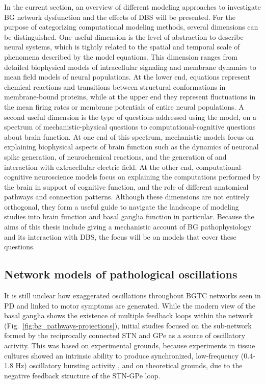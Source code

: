 %
%
%
%
%
%
In the current section, an overview of different modeling approaches to investigate
BG network dysfunction and the effects of DBS will be presented.
For the purpose of categorizing computational modeling methods, several dimensions
can be distinguished. One useful dimension is the level of abstraction to describe
neural systems, which is tightly related to the spatial and temporal scale of phenomena
described by the model equations. This dimension ranges from detailed biophysical models
of intracellular signaling and membrane dynamics to mean field models of neural populations.
At the lower end, equations represent chemical reactions and transitions between structural
conformations in membrane-bound proteins, while at the upper end they represent fluctuations in the
mean firing rates or membrane potentials of entire neural populations.
%
A second useful dimension is the type of questions addressed using the model, on
a spectrum of mechanistic-physical questions to computational-cognitive questions
about brain function.
At one end of this spectrum, mechanistic models focus on explaining biophysical aspects
of brain function such as the dynamics of neuronal spike generation, of neurochemical
reactions, and the generation of and interaction with extracellular electric field.
At the other end, computational-cognitive neuroscience models
focus on explaining the computations performed by the brain in support of cognitive
function, and the role of different anatomical pathways and connection patterns.
%
Although these dimensions are not entirely orthogonal, they form a useful guide to
navigate the landscape of modeling studies into brain function and basal ganglia
function in particular. %
Because the aims of this thesis include giving a mechanistic account of BG pathophysiology
and its interaction with DBS, the focus will be on models that cover these questions.
%
%
%

%
\subsection{Network models of pathological oscillations} %
\label{sec:ch2-litrev/oscillation-models}
%
%
%
%
%
%
%

It is still unclear how exaggerated oscillations throughout BGTC networks seen in PD
and linked to motor symptoms are generated. While the modern view of the basal ganglia
shows the existence of multiple feedback loops within the network (Fig.~\ref{fig:bg_pathways-projections}),
initial studies focused on the sub-network formed by the reciprocally connected
STN and GPe as a source of oscillatory activity. This was based on experimental grounds,
because experiments in tissue cultures showed an intrinsic ability to produce synchronized,
low-frequency (0.4-1.8 Hz) oscillatory bursting activity \cite{plenz_basal_1999},
and on theoretical grounds, due to the negative feedback structure of the STN-GPe loop.

